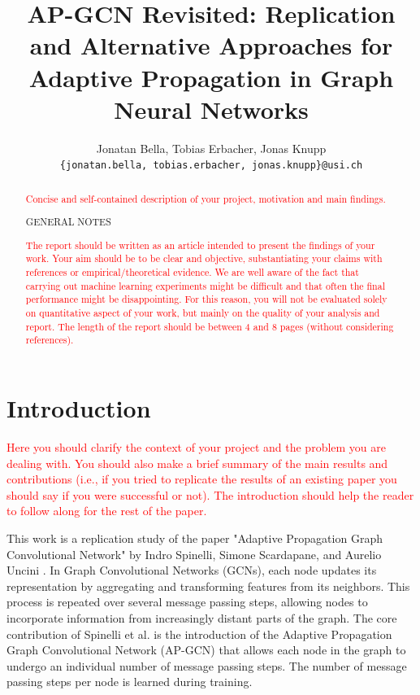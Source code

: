 \documentclass{gdl}
\begin{document}
\title{AP-GCN Revisited: Replication and Alternative Approaches for Adaptive Propagation in Graph Neural Networks}

\author{%
Jonatan Bella, Tobias Erbacher, Jonas Knupp\\
\texttt{\{jonatan.bella, tobias.erbacher, jonas.knupp\}@usi.ch}
}

\begin{abstract}
\textcolor{red}{Concise and self-contained description of your project, motivation and main findings.}

\begin{center}
    \sf\large\color{red} GENERAL NOTES
\end{center}

\textcolor{red}{The report should be written as an article intended to present the findings of your work. Your aim should be to be clear and objective, substantiating your claims with references or empirical/theoretical evidence.
We are well aware of the fact that carrying out machine learning experiments might be difficult and that often the final performance might be disappointing. For this reason, you will not be evaluated solely on quantitative aspect of your work, but mainly on the quality of your analysis and report.
The length of the report should be between 4 and 8 pages (without considering references).}

\end{abstract}

\maketitle

\section{Introduction}

\textcolor{red}{Here you should clarify the context of your project and the problem you are dealing with. You should also make a brief summary of the main results and contributions (i.e., if you tried to replicate the results of an existing paper you should say if you were successful or not). The introduction should help the reader to follow along for the rest of the paper.}

This work is a replication study of the paper "Adaptive Propagation Graph Convolutional Network" by Indro Spinelli, Simone Scardapane, and Aurelio Uncini \cite{spinelli2021}. In Graph Convolutional Networks (GCNs), each node updates its representation by aggregating and transforming features from its neighbors. This process is repeated over several message passing steps, allowing nodes to incorporate information from increasingly distant parts of the graph. The core contribution of Spinelli et al. is the introduction of the Adaptive Propagation Graph Convolutional Network (AP-GCN) that allows each node in the graph to undergo an individual number of message passing steps. The number of message passing steps per node is learned during training.
\end{document}

